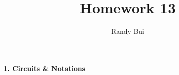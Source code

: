 \documentclass[12px]{article}
\title{Homework 13}
\author{Randy Bui}
\begin{document}
\maketitle
\newpage
\large
\textbf{1. Circuits \& Notations}
\end{document}
